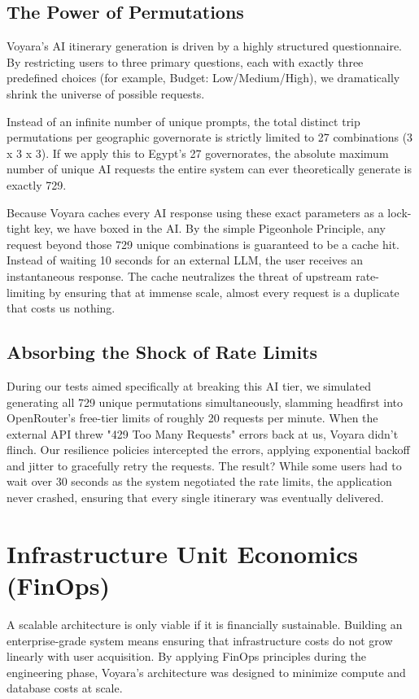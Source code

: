 \subsection{The Power of Permutations}
Voyara's AI itinerary generation is driven by a highly structured questionnaire. By restricting users to three primary questions, each with exactly three predefined choices (for example, Budget: Low/Medium/High), we dramatically shrink the universe of possible requests.

Instead of an infinite number of unique prompts, the total distinct trip permutations per geographic governorate is strictly limited to 27 combinations (3 x 3 x 3). If we apply this to Egypt's 27 governorates, the absolute maximum number of unique AI requests the entire system can ever theoretically generate is exactly 729.

Because Voyara caches every AI response using these exact parameters as a lock-tight key, we have boxed in the AI. By the simple Pigeonhole Principle, any request beyond those 729 unique combinations is guaranteed to be a cache hit. Instead of waiting 10 seconds for an external LLM, the user receives an instantaneous response. The cache neutralizes the threat of upstream rate-limiting by ensuring that at immense scale, almost every request is a duplicate that costs us nothing.

\subsection{Absorbing the Shock of Rate Limits}
During our tests aimed specifically at breaking this AI tier, we simulated generating all 729 unique permutations simultaneously, slamming headfirst into OpenRouter's free-tier limits of roughly 20 requests per minute. When the external API threw "429 Too Many Requests" errors back at us, Voyara didn't flinch. Our resilience policies intercepted the errors, applying exponential backoff and jitter to gracefully retry the requests. The result? While some users had to wait over 30 seconds as the system negotiated the rate limits, the application never crashed, ensuring that every single itinerary was eventually delivered.

\section{Infrastructure Unit Economics (FinOps)}
A scalable architecture is only viable if it is financially sustainable. Building an enterprise-grade system means ensuring that infrastructure costs do not grow linearly with user acquisition. By applying FinOps principles during the engineering phase, Voyara's architecture was designed to minimize compute and database costs at scale.

